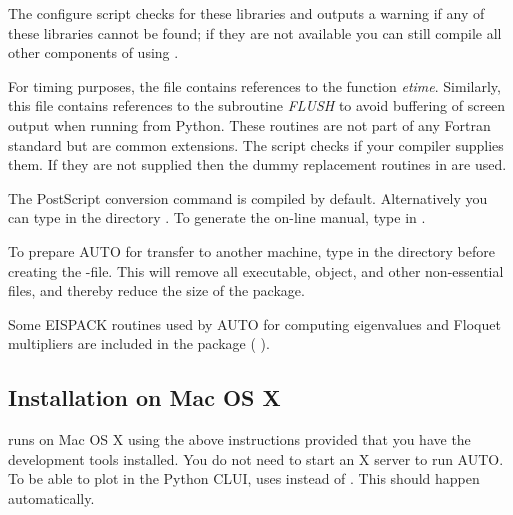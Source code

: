 \documentclass[12pt]{report}
\begin{document}
The configure script checks
for these libraries and outputs a warning if any of these libraries
cannot be found; if they are not available you can still compile
all other components of \AUTO using .

For timing purposes, the file 
contains references to the function {\it etime}.
Similarly, this file contains references to the
subroutine {\it FLUSH} to avoid buffering of screen output when
running \AUTO from Python. These routines are not part of any
Fortran standard but are common extensions. The 
script checks if your compiler supplies them. If they are not
supplied then the dummy replacement routines in 
are used.

The PostScript conversion command  is compiled by
default. Alternatively you can type  in the directory
.
To generate the on-line manual, type  in .

To prepare {\cal AUTO} for transfer to another machine,
type 
in the directory  before creating the -file. 
This will remove all executable, object, and other non-essential files, and
thereby reduce the size of the package.

Some {\cal EISPACK} routines used by {\cal AUTO} for computing eigenvalues and
Floquet multipliers are included in the package
( \citeyear{EISPACK:76}).

\subsection{Installation on Mac OS X}
\AUTO runs on Mac OS X using the above instructions provided that
you have the development tools
installed. You do not need to start an X server to run AUTO. To be able
to plot in the Python CLUI, \AUTO uses  instead of
. This should happen automatically.
\end{document}
